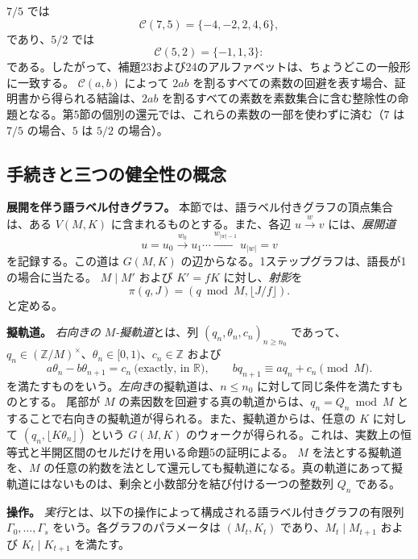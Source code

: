 \documentclass[11pt,reqno]{amsart}
\theoremstyle{definition}
\theoremstyle{definition}
\theoremstyle{remark}
\begin{document}
\(7/5\) では
\[
\mathcal C(7,5)=\{-4,-2,2,4,6\},
\]
であり、\(5/2\) では
\[
\mathcal C(5,2)=\{-1,1,3\}:
\]
である。したがって、補題23および24のアルファベットは、ちょうどこの一般形に一致する。
\(\mathcal C(a,b)\) によって \(2ab\) を割るすべての素数の回避を表す場合、証明書から得られる結論は、\(2ab\) を割るすべての素数を素数集合に含む整除性の命題となる。第5節の個別の還元では、これらの素数の一部を使わずに済む（\(7\) は \(7/5\) の場合、\(5\) は \(5/2\) の場合）。

\subsection{手続きと三つの健全性の概念}\label{sec:7.2}

\textbf{展開を伴う語ラベル付きグラフ。} 本節では、語ラベル付きグラフの頂点集合は、ある \(V(M,K)\) に含まれるものとする。また、各辺 \(u\xrightarrow{w}v\) には、\emph{展開道}
\[
u=u_0\xrightarrow{w_0}u_1\cdots\xrightarrow{w_{|w|-1}}u_{|w|}=v
\]
を記録する。この道は \(G(M,K)\) の辺からなる。1ステップグラフは、語長が1の場合に当たる。
\(M\mid M'\) および \(K'=fK\) に対し、\emph{射影}を
\[
\pi(q,J)=(q\bmod M,\lfloor J/f\rfloor).
\]
と定める。

\textbf{擬軌道。} \emph{右向きの \(M\)-擬軌道}とは、列 \((q_n,\theta_n,c_n)_{n\ge n_0}\) であって、\(q_n\in(\mathbb Z/M)^\times\)、\(\theta_n\in[0,1)\)、\(c_n\in\mathbb Z\) および
\[
a\theta_n-b\theta_{n+1}=c_n\ \text{(exactly, in }\mathbb R),\qquad
bq_{n+1}\equiv aq_n+c_n\pmod M .
\]
を満たすものをいう。\emph{左向き}の擬軌道は、\(n\le n_0\) に対して同じ条件を満たすものとする。
尾部が \(M\) の素因数を回避する真の軌道からは、\(q_n=Q_n\bmod M\) とすることで右向きの擬軌道が得られる。また、擬軌道からは、任意の \(K\) に対して \((q_n,\lfloor K\theta_n\rfloor)\) という \(G(M,K)\) のウォークが得られる。これは、実数上の恒等式と半開区間のセルだけを用いる命題5の証明による。
\(M\) を法とする擬軌道を、\(M\) の任意の約数を法として還元しても擬軌道になる。真の軌道にあって擬軌道にはないものは、剰余と小数部分を結び付ける一つの整数列 \(Q_n\) である。

\textbf{操作。} \emph{実行}とは、以下の操作によって構成される語ラベル付きグラフの有限列 \(\Gamma_0,\ldots,\Gamma_s\) をいう。各グラフのパラメータは \((M_t,K_t)\) であり、\(M_t\mid M_{t+1}\) および \(K_t\mid K_{t+1}\) を満たす。
\end{document}
